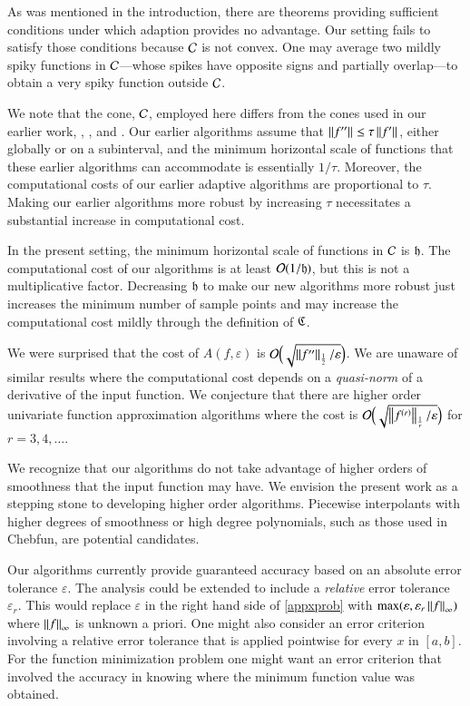 \documentclass[review]{elsarticle}
\newcommand{\abstol}{\varepsilon}
\theoremstyle{definition}
\begin{document}
As was mentioned in the introduction, there are theorems providing sufficient conditions under which adaption provides no advantage.  Our setting fails to satisfy those conditions because $\cc$ is not convex.  One may average two mildly spiky functions in $\cc$---whose spikes have opposite signs and partially overlap---to obtain a very spiky function outside $\cc$.

We note that the cone, $\cc$, employed here differs from the cones used in our earlier work, \cite{HicEtal14b}, \cite{Din15a}, and \cite{Ton14a}.  Our earlier algorithms assume that $\norm{f''} \le \tau\norm{f'}$, either globally or on a subinterval, and the minimum horizontal scale of functions that these earlier algorithms can accommodate is  essentially $1/\tau$.  Moreover, the computational costs of our earlier adaptive algorithms are proportional to $\tau$.  Making our earlier algorithms more robust by increasing $\tau$ necessitates a substantial increase in computational cost.

In the present setting, the minimum horizontal scale of functions in $\cc$ is $\fh$.  The computational cost of our algorithms is at least $\Order(1/\fh)$, but this is not a multiplicative factor.  Decreasing $\fh$ to make our new algorithms more robust just increases the minimum number of sample points and may increase the computational cost mildly through the definition of $\fC$.

We were surprised that the cost of $A(f,\abstol)$ is $\Order\Bigl(\sqrt{\norm[\frac12]{f''}/\abstol}\Bigr)$.  We are unaware of similar results where the computational cost depends on a \emph{quasi-norm} of a derivative of the input function.  We  conjecture that there are higher order univariate function approximation algorithms where the cost is $\Order\Bigl(\sqrt{\norm[\frac1r]{f^{(r)}}/\abstol}\Bigr)$ for $r = 3, 4, \ldots$.

We recognize that our algorithms do not take advantage of higher orders of smoothness that the input function may have.  We envision the present work as a stepping stone to developing higher order algorithms.  Piecewise interpolants with higher degrees of smoothness or high degree polynomials, such as those used in Chebfun, are potential candidates.

Our algorithms currently provide guaranteed accuracy based on an absolute error
tolerance $\abstol$. The analysis could be extended to include a \emph{relative}
error tolerance $\varepsilon_r$.  This would replace $\abstol$ in the right hand side of \eqref{appxprob} with $\max (\varepsilon, \varepsilon_r \norm[\infty]{f})$ where $\norm[\infty]{f}$ is unknown a priori.  One might also consider an error criterion involving a relative error tolerance that is applied pointwise for every $x$ in $[a,b]$.  For the function minimization problem one might want an error criterion that involved the accuracy in knowing where the minimum function value was obtained.
\end{document}
